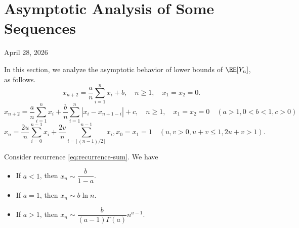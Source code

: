
\chapter{Asymptotic Analysis of Some Sequences}
\begin{center}
  April 28, 2026
  \vspace{0.5cm}
\end{center}

In this section, we analyze the asymptotic behavior of lower bounds of $\EE[Y_n]$, as follows.
\begin{equation}
  \label{eq:recurrence-sum}
  x_{n+2} = \dfrac{a}{n}\sum_{i=1}^{n}x_i + b, \quad n \ge 1, \quad x_1=x_2=0.
\end{equation}
\begin{equation}
  \label{eq:recurrence-diff}
  x_{n+2} = \dfrac{a}{n}\sum_{i=1}^{n}x_i + \dfrac{b}{n}\sum_{i=1}^{n}|x_i - x_{n+1-i}| + c, \quad n \ge 1, \quad x_1=x_2=0 \quad (a>1, 0 < b < 1, c>0)
\end{equation}
\begin{equation}
  \label{eq:recurrence-sum-half-sum}
  x_{n} = \dfrac{2u}{n}\sum_{i=0}^{n-1}x_i + \dfrac{2v}{n}\sum_{i=\lfloor (n-1)/2 \rfloor}^{n-1}x_{i}, x_0=x_1=1 \quad (u,v > 0, u+v\le1, 2u+v>1).
\end{equation}

\begin{proposition}
  Consider recurrence \eqref{eq:recurrence-sum}. We have
  \begin{itemize}
    \item If $a<1$, then $x_n \sim \dfrac{b}{1-a}$.
    \item If $a=1$, then $x_n \sim b\ln n$.
    \item If $a>1$, then $x_n \sim \dfrac{b}{(a-1)\Gamma(a)} n^{a-1}$.
  \end{itemize}
\end{proposition}

